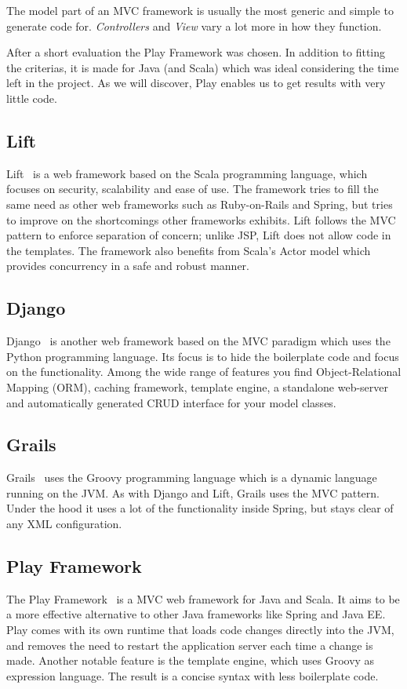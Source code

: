 The model part of an MVC framework is usually the most generic and simple to generate code for. \emph{Controllers} and \emph{View} vary a lot more in how they function.  

After a short evaluation the Play Framework was chosen. In addition to fitting the criterias, it is made for Java (and Scala) which was ideal considering the time left in the project. As we will discover, Play enables us to get results with very little code.

\subsection{Lift}
Lift~\cite{liftweb} is a web framework based on the Scala programming language, which focuses on security, scalability and ease of use. The framework tries to fill the same need as other web frameworks such as Ruby-on-Rails and Spring, but tries to improve on the shortcomings other frameworks exhibits. Lift follows the MVC pattern to enforce separation of concern; unlike JSP, Lift does not allow code in the templates. The framework also benefits from Scala's Actor model which provides concurrency in a safe and robust manner. 

\subsection{Django}
Django~\cite{django} is another web framework based on the MVC paradigm which uses the Python programming language. Its focus is to hide the boilerplate code and focus on the functionality. 
Among the wide range of features you find Object-Relational Mapping (ORM), caching framework, template engine, a standalone web-server and automatically generated CRUD interface for your model classes. 

\subsection{Grails}
Grails~\cite{grails} uses the Groovy programming language which is a dynamic language running on the JVM. As with Django and Lift, Grails uses
the MVC pattern. Under the hood it uses a lot of the functionality inside Spring, but stays clear of any XML configuration.

\subsection{Play Framework}
The Play Framework~\cite{playframework} is a MVC web framework for Java and Scala. It aims to be a more effective alternative to other Java frameworks like Spring and Java EE. Play comes with its own runtime that loads code changes directly into the JVM, and removes the need to restart the application server each time a change is made. Another notable feature is the template engine, which uses Groovy as expression language. The result is a concise syntax with less boilerplate code.

